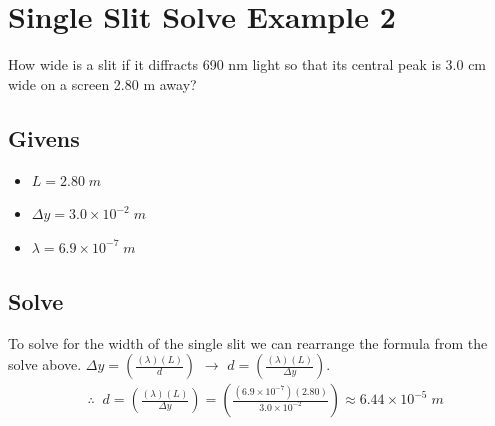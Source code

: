 \documentclass{article}
\begin{document}
\section{Single Slit Solve Example 2}
How wide is a slit if it diffracts 690 nm light so that its central peak is 3.0 cm wide on a screen 2.80 m away?
\subsection*{Givens}
\begin{itemize}
    \item $L = 2.80\;m$
    \item $ \Delta y = 3.0 \times 10^{-2}\;m$
    \item $\lambda = 6.9 \times 10^{-7}\;m$
\end{itemize}\leavevmode
\subsection*{Solve}
To solve for the width of the single slit we can rearrange the formula from the solve above. $\Delta y = \left(\frac{(\lambda)(L)}{d}\right)$ $\to$ $d = \left(\frac{(\lambda)(L)}{\Delta y}\right)$.\\
\begin{align*}
     & \therefore\;\;d = \left(\frac{(\lambda)(L)}{\Delta y}\right) = \left(\frac{(6.9 \times 10^{-7})(2.80)}{3.0 \times 10^{-2}}\right) \approx 6.44 \times 10^{-5}\;m
\end{align*}\leavevmode\\
\end{document}
